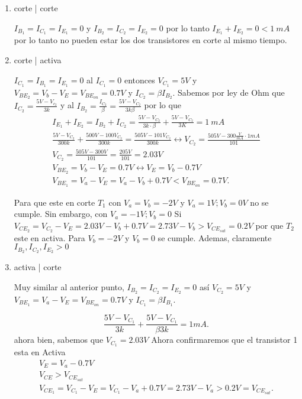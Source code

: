\documentclass[12pt]{exam}
\begin{document}
    \begin{enumerate}
      \item corte | corte

	$I_{B_1} = I_{C_1} = I_{E_1} = 0$ y $I_{B_2} = I_{C_2} = I_{E_2} = 0$ por lo tanto $I_{E_1} + I_{E_2} = 0 < 1\ mA$ por lo tanto no pueden estar los dos transistores en corte al mismo tiempo.
      \item corte | activa

	$I_{C_1} = I_{B_1} = I_{E_1} = 0$ al $I_{C_1} = 0$ entonces $V_{C_1} = 5V$ y $V_{BE_2} = V_b - V_E = V_{BE_{on}}= 0.7V$ y $I_{C_2} = \beta I_{B_2}$. Sabemos por ley de Ohm que $I_{C_2} = \frac{5V - V_{c_2}}{3k}$ y al $I_{B_2} =  \frac{I_{C_2}}{\beta} = \frac{5V - V_{C_2}}{3k\beta}$ por lo que
	\begin{align*}
	  I_{E_1} + I_{E_2} = I_{B_2} + I_{C_2} = \frac{5V - V_{C_2}}{3k\cdot \beta} + \frac{5V - V_{C_2}}{3K} = 1\ mA\\
	  \frac{5V - V_{C_2}}{300 k}+ \frac{500 V - 100 V_{C_2}}{300 k} = \frac{505 V - 101 V_{C_2}}{300 k}\leftrightarrow V_{C_2} = \frac{505 V - 300 \frac{V}{mA}\cdot 1mA}{101}\\
	  V_{C_2} = \frac{505 V - 300 V}{101} = \frac{205 V}{101} = 2.03 V\\
	  V_{BE_2} = V_b - V_E = 0.7V \leftrightarrow V_E = V_b - 0.7 V\\
	  V_{BE_1} = V_a - V_E = V_a - V_b + 0.7V < V_{BE_{on}} = 0.7V
	.\end{align*}

	Para que este en corte $T_1$ con $V_a = V_b = -2V$ y $V_a = 1V; V_b = 0V$ no se cumple. Sin embargo, con $V_a = -1V; V_b = 0$ Si $V_{CE_2} = V_{C_2} - V_E = 2.03V - V_b + 0.7V = 2.73V - V_b > V_{CE_{sat}} = 0.2V$ por que $T_2$ este en activa. Para $V_b = -2V$ y $V_b = 0$ se cumple. Ademas, claramente $I_{B_2}, I_{C_2}, I_{E_2} > 0$

      \item activa | corte

	Muy similar al anterior punto, $I_{B_2} = I_{C_2} = I_{E_2} = 0$ así $V_{C_2} = 5V$ y $V_{BE_1}= V_a - V_E = V_{BE_{on}}=0.7V$ y $I_{C_1}=\beta I_{B_1}$.

	\[
	\frac{5V - V_{C_1}}{3k} + \frac{5V - V_{C_1}}{\beta 3k}= 1mA
	.\]  ahora bien, sabemos que $V_{C_1} = 2.03V$ Ahora confirmaremos que el transistor 1 esta en Activa
	\begin{align*}
	  V_E = V_a - 0.7V\\
	  V_{CE} > V_{CE_{sat}}\\
	  V_{CE_1}=V_{C_1}- V_{E} = V_{C_1} - V_a + 0.7V = 2.73V - V_a > 0.2V = V_{CE_{sat}}
	.\end{align*}


\end{enumerate}
\end{document}
